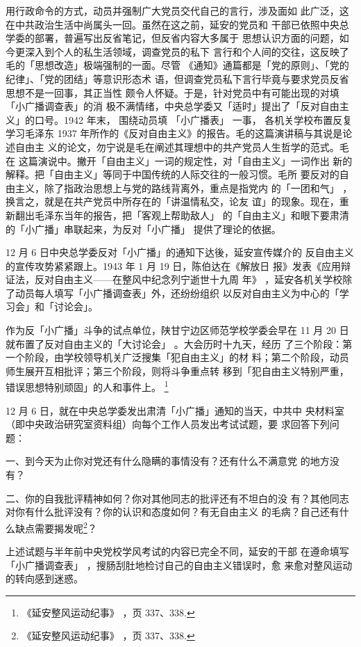用行政命令的方式，动员并强制广大党员交代自己的言行，涉及面如
此广泛，这在中共政治生活中尚属头一回。虽然在这之前，延安的党员和
干部已依照中央总学委的部署，普遍写出反省笔记，但反省内容大多属于
思想认识方面的问题，如今更深入到个人的私生活领域，调查党员的私下
言行和个人间的交往，这反映了毛的「思想改造」极端强制的一面。尽管
《通知》通篇都是「党的原则」、「党的纪律」、「党的团结」等意识形态术
语，但调查党员私下言行毕竟与要求党员反省思想不是一回事，其正当性
颇令人怀疑。于是，针对党员中有可能出现的对填「小广播调查表」的消
极不满情绪，中央总学委又「适时」提出了「反对自由主义」的口号。1942
年末，
围绕动员填
「小广播表」
一事，
各机关学校布置反复学习毛泽东 1937
年所作的《反对自由主义》的报告。毛的这篇演讲稿与其说是论述自由主
义的论文，勿宁说是毛在阐述其理想中的共产党员人生哲学的范式。毛在
这篇演说中。撇开「自由主义」一词的规定性，对「自由主义」一词作出
新的解释。把「自由主义」等同于中国传统的人际交往的一般习惯。毛所
要反对的自由主义，除了指政治思想上与党的路线背离外，重点是指党内
的「一团和气」
，换言之，就是在共产党员中所存在的「讲温情私交，论友
谊」的现象。现在，重新翻出毛泽东当年的报告，把「客观上帮助敌人」
的「自由主义」和眼下要肃清的「小广播」串联起来，为反对「小广播」
提供了理论的依据。

12 月 6 日中央总学委反对「小广播」的通知下达後，延安宣传媒介的
反自由主义的宣传攻势紧紧跟上。1943 年 1 月 19 日，陈伯达在《解放日
报》发表《应用辩证法，反对自由主义——在整风中纪念列宁逝世十九周
年》
，延安各机关学校除了动员每人填写「小广播调查表」外，还纷纷组织
以反对自由主义为中心的「学习会」和「讨论会」。

作为反「小广播」斗争的试点单位，陕甘宁边区师范学校学委会早在
11 月 20 日就布置了反对自由主义的「大讨论会」
。大会历时十九天，经历
了三个阶段：第一个阶段，由学校领导机关广泛搜集「犯自由主义」的材
料；第二个阶段，动员师生展开互相批评；第三个阶段，则将斗争重点转
移到「犯自由主义特别严重，错误思想特别顽固」的人和事件上。
\footnote{《延安整风运动纪事》
，页 337、338. 
}

12 月 6 日，就在中央总学委发出肃清「小广播」通知的当天，中共中
央材料室（即中央政治研究室资料组）向每个工作人员发出考试试题，要
求回答下列问题：

一、到今天为止你对党还有什么隐瞒的事情没有？还有什么不满意党
的地方没有？

二、你的自我批评精神如何？你对其他同志的批评还有不坦白的没
有？其他同志对你有什么批评没有？你的认识和态度如何？有无自由主义
的毛病？自己还有什么缺点需要揭发呢\footnote{《延安整风运动纪事》
，页 337、338.}？

上述试题与半年前中央党校学风考试的内容已完全不同，延安的干部
在遵命填写「小广播调查表」
，搜肠刮肚地检讨自己的自由主义错误时，愈
来愈对整风运动的转向感到迷惑。

